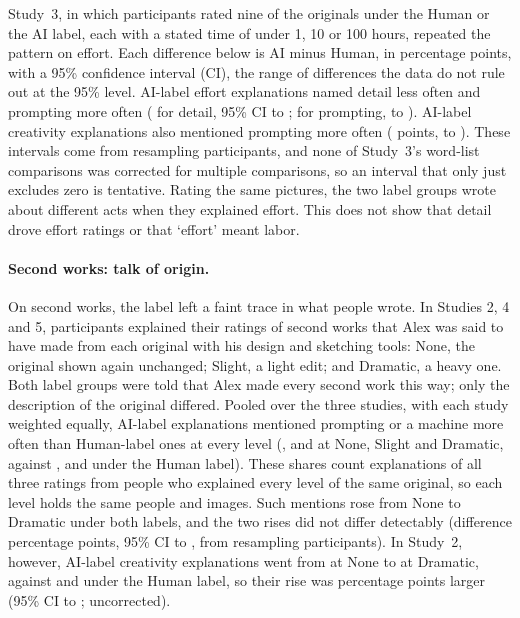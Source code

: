 Study~3, in which \SThreeN{} participants rated nine of the originals under the Human or the AI label, each with a stated time of under 1, 10 or 100 hours, repeated the pattern on effort. Each difference below is AI minus Human, in percentage points, with a 95\% confidence interval (CI), the range of differences the data do not rule out at the 95\% level. AI-label effort explanations named detail less often and prompting more often (\SThreeTextWordEffDetailDiff{} for detail, 95\% CI \SThreeTextWordEffDetailLo{} to \SThreeTextWordEffDetailHi; \SThreeTextWordEffPromptDiff{} for prompting, \SThreeTextWordEffPromptLo{} to \SThreeTextWordEffPromptHi). AI-label creativity explanations also mentioned prompting more often (\SThreeTextWordCreatPromptDiff{} points, \SThreeTextWordCreatPromptLo{} to \SThreeTextWordCreatPromptHi). These intervals come from resampling participants, and none of Study~3's word-list comparisons was corrected for multiple comparisons, so an interval that only just excludes zero is tentative. Rating the same pictures, the two label groups wrote about different acts when they explained effort. This does not show that detail drove effort ratings or that `effort' meant labor.

\paragraph*{Second works: talk of origin.}
On second works, the label left a faint trace in what people wrote. In Studies 2, 4 and 5, participants explained their ratings of second works that Alex was said to have made from each original with his design and sketching tools: None, the original shown again unchanged; Slight, a light edit; and Dramatic, a heavy one. Both label groups were told that Alex made every second work this way; only the description of the original differed. Pooled over the three studies, with each study weighted equally, AI-label explanations mentioned prompting or a machine more often than Human-label ones at every level (\XSOriginTalkAINonePct, \XSOriginTalkAISlightPct{} and \XSOriginTalkAIDramaticPct{} at None, Slight and Dramatic, against \XSOriginTalkHumanNonePct, \XSOriginTalkHumanSlightPct{} and \XSOriginTalkHumanDramaticPct{} under the Human label). These shares count explanations of all three ratings from people who explained every level of the same original, so each level holds the same people and images. Such mentions rose from None to Dramatic under both labels, and the two rises did not differ detectably (difference \XSOriginTalkChangeDiffPts{} percentage points, 95\% CI \XSOriginTalkChangeDiffLoPts{} to \XSOriginTalkChangeDiffHiPts, from resampling participants). In Study~2, however, AI-label creativity explanations went from \XSOriginTalkSTwoCreatAINonePct{} at None to \XSOriginTalkSTwoCreatAIDramaticPct{} at Dramatic, against \XSOriginTalkSTwoCreatHumanNonePct{} and \XSOriginTalkSTwoCreatHumanDramaticPct{} under the Human label, so their rise was \XSOriginTalkSTwoCreatChangeDiffPts{} percentage points larger (95\% CI \XSOriginTalkSTwoCreatChangeDiffLoPts{} to \XSOriginTalkSTwoCreatChangeDiffHiPts; uncorrected).


